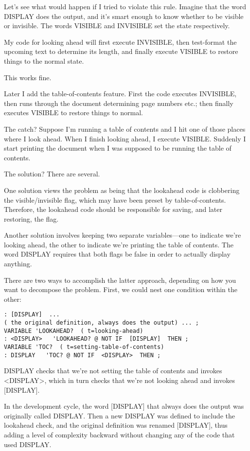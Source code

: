 Let's see what would happen if I tried to violate this rule. Imagine
that the word DISPLAY does the output, and it's smart enough to know
whether to be visible or invisible. The words VISIBLE and INVISIBLE
set the state respectively.

My code for looking ahead will first execute INVISIBLE, then
test-format the upcoming text to determine its length, and finally execute
VISIBLE to restore things to the normal state.

This works fine.

Later I add the table-of-contents feature. First the code executes
INVISIBLE, then runs through the document determining page
numbers etc.; then finally executes VISIBLE to restore things to normal.

The catch? Suppose I'm running a table of contents and I hit one of
those places where I look ahead. When I finish looking ahead, I execute
VISIBLE. Suddenly I start printing the document when I was supposed
to be running the table of contents.

The solution? There are several.

One solution views the problem as being that the lookahead code is
clobbering the visible/invisible flag, which may have been preset by
table-of-contents. Therefore, the lookahead code should be responsible for
saving, and later restoring, the flag.

Another solution involves keeping two separate variables---one to
indicate we're looking ahead, the other to indicate we're printing the
table of contents. The word DISPLAY requires that both flags be false in
order to actually display anything.

There are two ways to accomplish the latter approach, depending on
how you want to decompose the problem. First, we could nest one condition
within the other:

\begin{verbatim}
: [DISPLAY]  ...
( the original definition, always does the output) ... ;
VARIABLE 'LOOKAHEAD?  ( t=looking-ahead)
: <DISPLAY>   'LOOKAHEAD? @ NOT IF  [DISPLAY]  THEN ;
VARIABLE 'TOC?  ( t=setting-table-of-contents)
: DISPLAY   'TOC? @ NOT IF  <DISPLAY>  THEN ;
\end{verbatim}

DISPLAY checks that we're not setting the table of contents and invokes
<DISPLAY>, which in turn checks that we're not looking ahead
and invokes [DISPLAY].

In the development cycle, the word [DISPLAY] that always does
the output was originally called DISPLAY. Then a new DISPLAY was
defined to include the lookahead check, and the original definition was
renamed [DISPLAY], thus adding a level of complexity backward
without changing any of the code that used DISPLAY.

